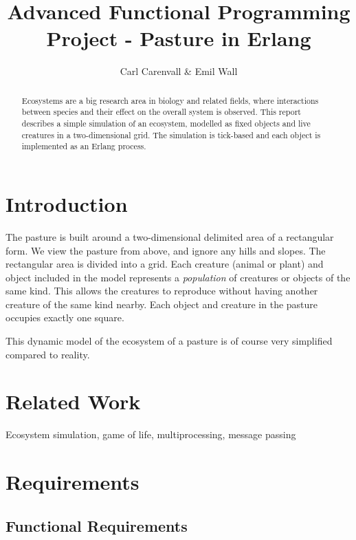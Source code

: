 \documentclass[12pt]{article}
\title{Advanced Functional Programming \\ Project - Pasture in Erlang}
\author{Carl Carenvall \& Emil Wall}
\begin{document}
\maketitle

\vspace{10mm}

\begin{abstract}
Ecosystems are a big research area in biology and related fields, where interactions between species and their effect on the overall system is observed. This report describes a simple simulation of an ecosystem, modelled as fixed objects and live creatures in a two-dimensional grid. The simulation is tick-based and each object is implemented as an Erlang process.
\end{abstract}

\newpage

\tableofcontents

\newpage

\section{Introduction}

The pasture is built around a two-dimensional delimited area of a rectangular form. We view the pasture from above, and ignore any hills and slopes. The rectangular area is divided into a grid. Each creature (animal or plant) and object included in the model represents a \emph{population} of creatures or objects of the same kind. This allows the creatures to reproduce without having another creature of the same kind nearby. Each object and creature in the pasture occupies exactly one square.

This dynamic model of the ecosystem of a pasture is of course very simplified compared to reality.

\section{Related Work}

Ecosystem simulation, game of life, multiprocessing, message passing

\newpage

\section{Requirements}

\subsection{Functional Requirements}
\end{document}
